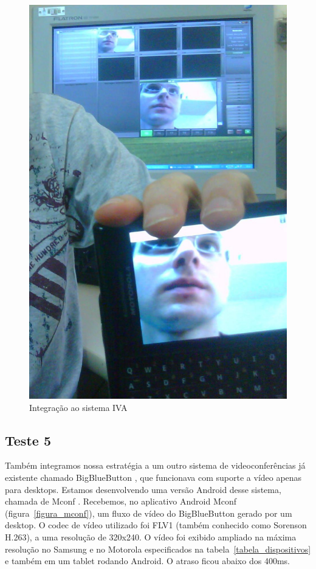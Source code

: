\documentclass{acm_proc_article-sp}
\begin{document}
\begin{figure}[htp]
 \centering
 \includegraphics[scale=0.15]{./ivamobile.jpg}
\caption{Integração ao sistema IVA}\label{figura_eadcel}
\end{figure}

\subsection{Teste 5}
Também integramos nossa estratégia a um outro sistema de videoconferências já existente chamado BigBlueButton \cite{bbb}, que funcionava com suporte a vídeo apenas para desktops. Estamos desenvolvendo uma versão Android desse sistema, chamada de Mconf \cite{mconf}. Recebemos, no aplicativo Android Mconf (figura~\ref{figura_mconf}), um fluxo de vídeo do BigBlueButton gerado por um desktop. O codec de vídeo utilizado foi FLV1 (também conhecido como Sorenson H.263), a uma resolução de 320x240. O vídeo foi exibido ampliado na máxima resolução no Samsung e no Motorola especificados na tabela~\ref{tabela_dispositivos} e também em um tablet rodando Android. O atraso ficou abaixo dos 400ms.
\end{document}
